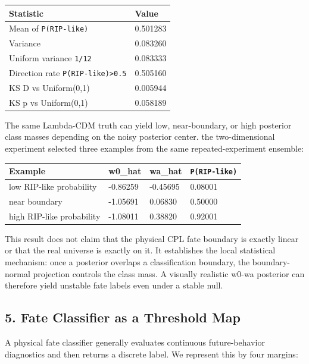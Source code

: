 \documentclass[
]{article}
\newcounter{none} %
\begin{document}
{\def\LTcaptype{none} %
\begin{longtable}[]{@{}ll@{}}
\toprule\noalign{}
Statistic & Value \\
\midrule\noalign{}
\endhead
\bottomrule\noalign{}
\endlastfoot
Mean of \texttt{P(RIP-like)} & 0.501283 \\
Variance & 0.083260 \\
Uniform variance \texttt{1/12} & 0.083333 \\
Direction rate \texttt{P(RIP-like)\textgreater{}0.5} & 0.505160 \\
KS D vs Uniform(0,1) & 0.005944 \\
KS p vs Uniform(0,1) & 0.058189 \\
\end{longtable}
}

The same Lambda-CDM truth can yield low, near-boundary, or high
posterior class masses depending on the noisy posterior center. the
two-dimensional experiment selected three examples from the same
repeated-experiment ensemble:

{\def\LTcaptype{none} %
\begin{longtable}[]{@{}llll@{}}
\toprule\noalign{}
Example & w0\_hat & wa\_hat & \texttt{P(RIP-like)} \\
\midrule\noalign{}
\endhead
\bottomrule\noalign{}
\endlastfoot
low RIP-like probability & -0.86259 & -0.45695 & 0.08001 \\
near boundary & -1.05691 & 0.06830 & 0.50000 \\
high RIP-like probability & -1.08011 & 0.38820 & 0.92001 \\
\end{longtable}
}

This result does not claim that the physical CPL fate boundary is
exactly linear or that the real universe is exactly on it. It
establishes the local statistical mechanism: once a posterior overlaps a
classification boundary, the boundary-normal projection controls the
class mass. A visually realistic w0-wa posterior can therefore yield
unstable fate labels even under a stable null.

\subsection{5. Fate Classifier as a Threshold
Map}\label{fate-classifier-as-a-threshold-map}

A physical fate classifier generally evaluates continuous
future-behavior diagnostics and then returns a discrete label. We
represent this by four margins:
\end{document}
